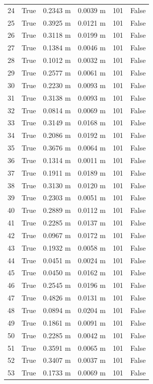 \documentclass[11pt,a4paper,oneside]{book}
\begin{document}
\begin{longtable}{l l l l l l}
24 & True & 0.2343 m & 0.0039 m & 101 & False \\
25 & True & 0.3925 m & 0.0121 m & 101 & False \\
26 & True & 0.3118 m & 0.0199 m & 101 & False \\
27 & True & 0.1384 m & 0.0046 m & 101 & False \\
28 & True & 0.1012 m & 0.0032 m & 101 & False \\
29 & True & 0.2577 m & 0.0061 m & 101 & False \\
30 & True & 0.2230 m & 0.0093 m & 101 & False \\
31 & True & 0.3138 m & 0.0093 m & 101 & False \\
32 & True & 0.0814 m & 0.0069 m & 101 & False \\
33 & True & 0.3149 m & 0.0168 m & 101 & False \\
34 & True & 0.2086 m & 0.0192 m & 101 & False \\
35 & True & 0.3676 m & 0.0064 m & 101 & False \\
36 & True & 0.1314 m & 0.0011 m & 101 & False \\
37 & True & 0.1911 m & 0.0189 m & 101 & False \\
38 & True & 0.3130 m & 0.0120 m & 101 & False \\
39 & True & 0.2303 m & 0.0051 m & 101 & False \\
40 & True & 0.2889 m & 0.0112 m & 101 & False \\
41 & True & 0.2285 m & 0.0137 m & 101 & False \\
42 & True & 0.0967 m & 0.0172 m & 101 & False \\
43 & True & 0.1932 m & 0.0058 m & 101 & False \\
44 & True & 0.0451 m & 0.0024 m & 101 & False \\
45 & True & 0.0450 m & 0.0162 m & 101 & False \\
46 & True & 0.2545 m & 0.0196 m & 101 & False \\
47 & True & 0.4826 m & 0.0131 m & 101 & False \\
48 & True & 0.0894 m & 0.0204 m & 101 & False \\
49 & True & 0.1861 m & 0.0091 m & 101 & False \\
50 & True & 0.2285 m & 0.0042 m & 101 & False \\
51 & True & 0.3591 m & 0.0065 m & 101 & False \\
52 & True & 0.3407 m & 0.0037 m & 101 & False \\
53 & True & 0.1733 m & 0.0069 m & 101 & False \\

\end{longtable}
\end{document}
